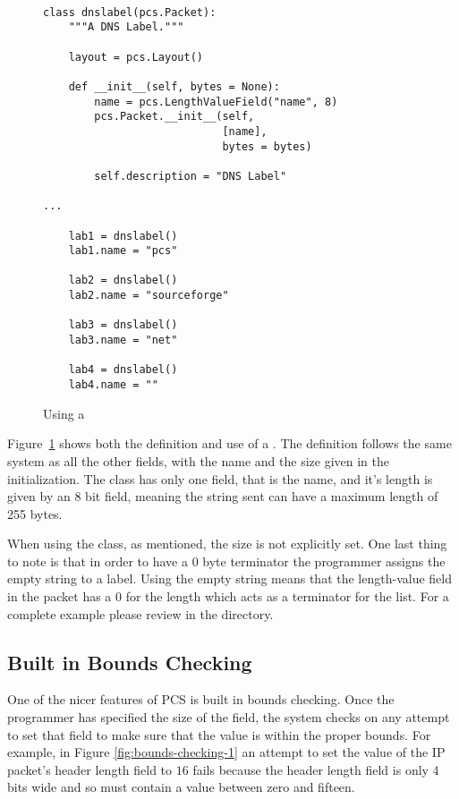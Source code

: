 \documentclass[11pt]{article}
\begin{document}
\begin{figure}
  \centering
\begin{verbatim}

class dnslabel(pcs.Packet):
    """A DNS Label.""" 

    layout = pcs.Layout()

    def __init__(self, bytes = None):
        name = pcs.LengthValueField("name", 8)
        pcs.Packet.__init__(self,
                            [name],
                            bytes = bytes)
        
        self.description = "DNS Label"

...

    lab1 = dnslabel()
    lab1.name = "pcs"

    lab2 = dnslabel()
    lab2.name = "sourceforge"

    lab3 = dnslabel()
    lab3.name = "net"

    lab4 = dnslabel()
    lab4.name = ""

\end{verbatim}
  \caption{Using a }
  \label{fig:using-a-length-value-field}
\end{figure}

Figure~\ref{fig:using-a-length-value-field} shows both the definition
and use of a .  The definition follows the
same system as all the other fields, with the name and the size given
in the initialization.  The  class has only one field,
that is the name, and it's length is given by an 8 bit field, meaning
the string sent can have a maximum length of 255 bytes.  

When using the class, as mentioned, the size is not explicitly set.
One last thing to note is that in order to have a 0 byte terminator
the programmer assigns the empty string to a label.  Using the empty
string means that the length-value field in the packet has a 0 for the
length which acts as a terminator for the list.  For a complete
example please review  in the 
directory.

\subsection{Built in Bounds Checking}
\label{sec:built-in-bounds-checking}

One of the nicer features of PCS is built in bounds checking.  Once
the programmer has specified the size of the field, the system checks
on any attempt to set that field to make sure that the value is within
the proper bounds.  For example, in Figure \ref{fig:bounds-checking-1}
an attempt to set the value of the IP packet's header length field to
$16$ fails because the header length field is only 4 bits wide and so
must contain a value between zero and fifteen.
\end{document}
